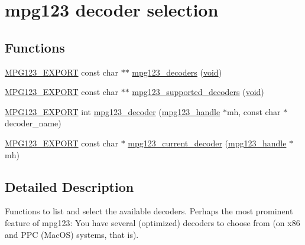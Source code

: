 \hypertarget{group__mpg123__decoder}{}\section{mpg123 decoder selection}
\label{group__mpg123__decoder}
\subsection*{Functions}
\begin{DoxyCompactItemize}
\item 
\mbox{\hyperlink{mpg123_8h_a2ba98cfba3f760879df70e755b2a61cc}{M\+P\+G123\+\_\+\+E\+X\+P\+O\+RT}} const char $\ast$$\ast$ \mbox{\hyperlink{group__mpg123__decoder_gaaa1b0af58f5f9654c736ccb24dcf0475}{mpg123\+\_\+decoders}} (\mbox{\hyperlink{_s_d_l__opengles2__gl2ext_8h_ae5d8fa23ad07c48bb609509eae494c95}{void}})
\item 
\mbox{\hyperlink{mpg123_8h_a2ba98cfba3f760879df70e755b2a61cc}{M\+P\+G123\+\_\+\+E\+X\+P\+O\+RT}} const char $\ast$$\ast$ \mbox{\hyperlink{group__mpg123__decoder_gaa74de136a5a49d0b420707e98e91a789}{mpg123\+\_\+supported\+\_\+decoders}} (\mbox{\hyperlink{_s_d_l__opengles2__gl2ext_8h_ae5d8fa23ad07c48bb609509eae494c95}{void}})
\item 
\mbox{\hyperlink{mpg123_8h_a2ba98cfba3f760879df70e755b2a61cc}{M\+P\+G123\+\_\+\+E\+X\+P\+O\+RT}} int \mbox{\hyperlink{group__mpg123__decoder_gae21df3e432dc90e9983d9fea25372cdc}{mpg123\+\_\+decoder}} (\mbox{\hyperlink{group__mpg123__init_ga6728e2839a395f3a07d4514da659faca}{mpg123\+\_\+handle}} $\ast$mh, const char $\ast$decoder\+\_\+name)
\item 
\mbox{\hyperlink{mpg123_8h_a2ba98cfba3f760879df70e755b2a61cc}{M\+P\+G123\+\_\+\+E\+X\+P\+O\+RT}} const char $\ast$ \mbox{\hyperlink{group__mpg123__decoder_gaa9e1be14b204d271ab57b679894c10e2}{mpg123\+\_\+current\+\_\+decoder}} (\mbox{\hyperlink{group__mpg123__init_ga6728e2839a395f3a07d4514da659faca}{mpg123\+\_\+handle}} $\ast$mh)
\end{DoxyCompactItemize}


\subsection{Detailed Description}
Functions to list and select the available decoders. Perhaps the most prominent feature of mpg123\+: You have several (optimized) decoders to choose from (on x86 and P\+PC (Mac\+OS) systems, that is). 

